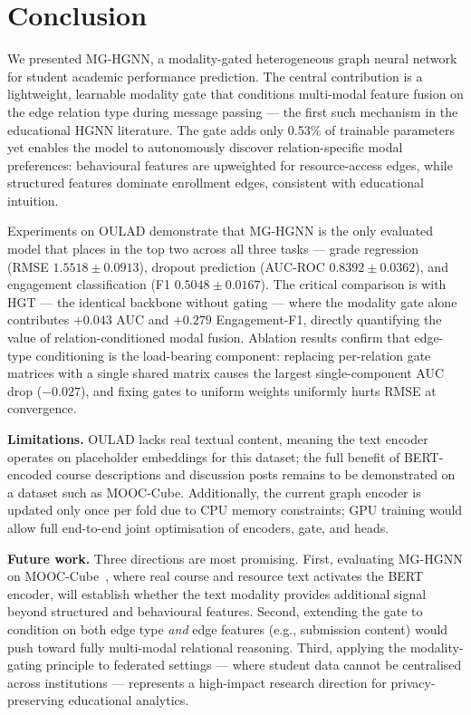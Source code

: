\documentclass[sigconf]{acmart}
\begin{document}
\section{Conclusion}
\label{sec:conclusion}
We presented MG-HGNN, a modality-gated heterogeneous
graph neural network for student academic performance
prediction. The central contribution is a lightweight,
learnable modality gate that conditions multi-modal
feature fusion on the edge relation type during
message passing --- the first such mechanism in the
educational HGNN literature. The gate adds only 0.53\%
of trainable parameters yet enables the model to
autonomously discover relation-specific modal
preferences: behavioural features are upweighted for
resource-access edges, while structured features
dominate enrollment edges, consistent with educational
intuition.

Experiments on OULAD demonstrate that MG-HGNN is the
only evaluated model that places in the top two across
all three tasks --- grade regression (RMSE
$1.5518 \pm 0.0913$), dropout prediction (AUC-ROC
$0.8392 \pm 0.0362$), and engagement classification
(F1 $0.5048 \pm 0.0167$). The critical comparison is
with HGT --- the identical backbone without gating ---
where the modality gate alone contributes $+0.043$
AUC and $+0.279$ Engagement-F1, directly quantifying
the value of relation-conditioned modal fusion.
Ablation results confirm that edge-type conditioning
is the load-bearing component: replacing per-relation
gate matrices with a single shared matrix causes the
largest single-component AUC drop ($-0.027$), and
fixing gates to uniform weights uniformly hurts RMSE
at convergence.

\textbf{Limitations.}
OULAD lacks real textual content, meaning the text
encoder operates on placeholder embeddings for this
dataset; the full benefit of BERT-encoded course
descriptions and discussion posts remains to be
demonstrated on a dataset such as MOOC-Cube.
Additionally, the current graph encoder is updated
only once per fold due to CPU memory constraints;
GPU training would allow full end-to-end joint
optimisation of encoders, gate, and heads.

\textbf{Future work.}
Three directions are most promising. First, evaluating
MG-HGNN on MOOC-Cube~\citep{yu2020mooccube}, where
real course and resource text activates the BERT
encoder, will establish
whether the text modality provides additional signal
beyond structured and behavioural features. Second,
extending the gate to condition on both edge type
\emph{and} edge features (e.g., submission content)
would push toward fully multi-modal relational
reasoning. Third, applying the modality-gating
principle to federated settings --- where student data
cannot be centralised across institutions --- represents
a high-impact research direction for privacy-preserving
educational analytics.
\end{document}
